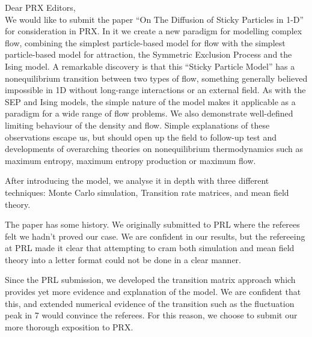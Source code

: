 \documentclass[a4paper,10pt]{article}
\title{}
\author{Joshua DM Hellier and Graeme J Ackland}
\begin{document}
\maketitle

 Dear PRX Editors, \\ 

We would like to submit the paper ``On The Diffusion of Sticky
Particles in 1-D'' for consideration in PRX.  In it we create a new
paradigm for modelling complex flow, combining the simplest
particle-based model for flow with the simplest particle-based model
for attraction, the Symmetric Exclusion Process and the Ising model.
A remarkable discovery is that this ``Sticky Particle Model'' has a
nonequilibrium transition between two types of flow, something 
generally believed impossible in 1D without long-range interactions or
an external field.  As with the SEP and Ising models, the simple
nature of the model makes it applicable as a paradigm for a wide range
of flow problems.  We also demonstrate well-defined limiting behaviour
of the density and flow.  Simple explanations of these observations
escape us, but should open up the field to follow-up test and
developments of overarching theories on nonequilibrium thermodynamics
such as maximum entropy, maximum entropy production or maximum flow.

After introducing the model, we analyse it in depth with three
different techniques: Monte Carlo simulation, Transition rate
matrices, and mean field theory.

The paper has some history.  We originally submitted to PRL where the
referees felt we hadn't proved our case.  We are confident in our
results, but the refereeing at PRL made it clear that attempting to
cram both simulation and mean field theory into a letter format could
not be done in a clear manner.

Since the PRL submission, we developed the transition matrix approach
which provides yet more evidence and explanation of the model.  We are
confident that this, and extended numerical evidence of the transition
such as the fluctuation peak in 7 would convince the referees.  For
this reason, we choose to submit our more thorough exposition to
PRX. 
\end{document}
